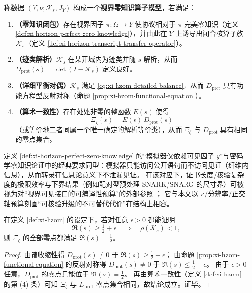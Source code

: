 \begin{definition}\label{def:xi-hzom}
称数据 \((Y,\nu;\mathcal{K}_s,J_Y)\) 构成一个\textbf{视界零知识算子模型}，若满足：
\begin{enumerate}
  \item \textbf{（零知识闭包）}存在视界因子 \(\pi:\Omega\to Y\) 使协议相对于 \(\pi\) 完美零知识（定义 \ref{def:xi-horizon-perfect-zero-knowledge}），并由此在 \(Y\) 上诱导出闭合核算子族 \(\mathcal{K}_s\)（定义 \ref{def:xi-horizon-transcript-transfer-operator}）。
  \item \textbf{（迹类解析）}\(\mathcal{K}_s\) 在某开域内为迹类并随 \(s\) 解析，从而 \(D_{\mathrm{prot}}(s)=\det(I-\mathcal{K}_s)\) 定义良好。
  \item \textbf{（详细平衡对偶）}\(\mathcal{K}_s\) 满足 \eqref{eq:xi-hzom-detailed-balance}，从而 \(D_{\mathrm{prot}}\) 具有功能方程型反射对称（命题 \ref{prop:xi-hzom-functional-equation}）。
  \item \textbf{（算术一致性）}存在处处非零的整函数 \(E(s)\) 使得
  \[
  \Xi_{\zeta}(s)=E(s)\,D_{\mathrm{prot}}(s)
  \]
  （或等价地二者同属一个唯一确定的解析等价类），从而 \(\Xi_{\zeta}\) 与 \(D_{\mathrm{prot}}\) 具有相同的零点集合。
\end{enumerate}
\end{definition}

\begin{remark}[与密码学零知识的抽象对齐]\label{rem:xi-hzom-crypto-alignment}
定义 \ref{def:xi-horizon-perfect-zero-knowledge} 的“模拟器仅依赖可见因子 \(y\)”与密码学零知识论证中的经典要求同型：模拟器只能访问公开语句而不访问见证（纤维内信息），从而转录在信息论意义下不泄漏见证。
在该对应下，证书长度/核验复杂度的极限效率与下界结果（例如配对型预处理 SNARK/SNARG 的尺寸界）可被视为对“视界可见接口的可编译性预算”的外部参照 \cite{Groth2016SizePairingNIZK}；
它与本文以 \(\kappa\)/分辨率/正交轴预算刻画“可核验升级的不可替代代价”在结构上相容。
\end{remark}

\begin{theorem}[HZOM 可检验收缩性模板：谱半径收缩 \texorpdfstring{$\Rightarrow$}{=>} 零点强迫临界化]\label{thm:xi-hzom-rh-reduction}
在定义 \ref{def:xi-hzom} 的设定下，若对任意 \(\epsilon>0\) 都能证明
\[
\Re(s)\ge \tfrac12+\epsilon\quad\Longrightarrow\quad \rho(\mathcal{K}_s)<1,
\]
则 \(\Xi_{\zeta}\) 的全部零点都满足 \(\Re(s)=\tfrac12\)。
\end{theorem}

\begin{proof}
由谱收缩性得 \(D_{\mathrm{prot}}(s)\neq 0\) 于 \(\Re(s)\ge \tfrac12+\epsilon\)；
由命题 \ref{prop:xi-hzom-functional-equation} 的反射对称得 \(D_{\mathrm{prot}}(s)\neq 0\) 于 \(\Re(s)\le \tfrac12-\epsilon\)。
由于 \(\epsilon>0\) 任意，\(D_{\mathrm{prot}}\) 的零点只能位于 \(\Re(s)=\tfrac12\)。
再由算术一致性（定义 \ref{def:xi-hzom} 的第 (4) 条）可知 \(\Xi_{\zeta}\) 与 \(D_{\mathrm{prot}}\) 零点集合相同，故结论成立。证毕。
\end{proof}

